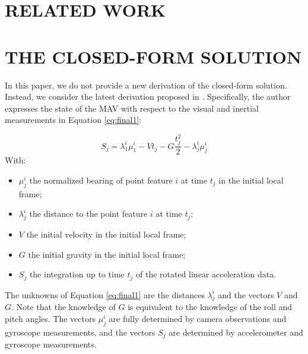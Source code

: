 \documentclass[letterpaper, 10 pt, conference]{ieeeconf}  %
\begin{document}
\section{RELATED WORK}
\section{THE CLOSED-FORM SOLUTION}

In this paper, we do not provide a new derivation of the closed-form solution.
Instead, we consider the latest derivation proposed in \cite{Martinelli2014}.
Specifically, the author expresses the state of the MAV with respect to the visual and inertial measurements in Equation \ref{eq:final1}:


\begin{equation} \tag{6} \label{eq:final1}
S_j = \lambda_1^i\mu_1^i - V t_j - G \frac{t_j^2}{2} - \lambda^i_j \mu^i_j
\end{equation}
With:
\begin{itemize}
\item $\mu_j^i$ the normalized bearing of point feature $i$ at time $t_j$ in the initial local frame;
\item $\lambda_j^i$ the distance to the point feature $i$ at time $t_j$;
\item $V$ the initial velocity in the initial local frame;
\item $G$ the initial gravity in the initial local frame;
\item $S_j$ the integration up to time $t_j$ of the rotated linear acceleration data.
\end{itemize}



The unknowns of Equation \ref{eq:final1} are the distances $\lambda_j^i$ and the vectors $V$ and $G$.
Note that the knowledge of $G$ is equivalent to the knowledge of the roll and pitch angles.
The vectors $\mu_j^i$ are fully determined by camera observations and gyroscope measurements,
and the vectors $S_j$ are determined by accelerometer and gyroscope measurements.
\end{document}
